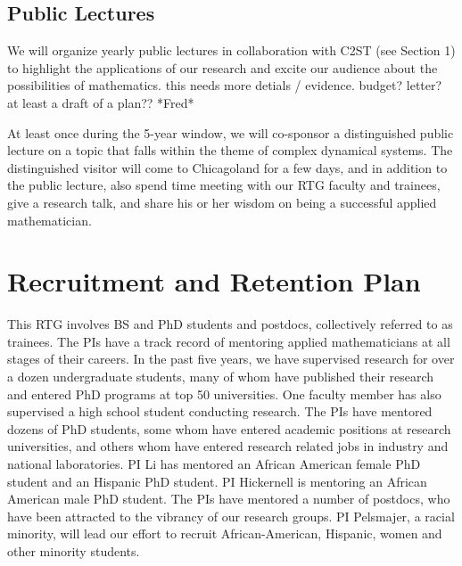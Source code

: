 \documentclass[11pt]{NSFamsart}
\begin{document}
\subsection*{Public Lectures} We will organize yearly public lectures in collaboration with  C2ST (see Section 1) to highlight the applications of   our research and excite our audience about the possibilities of mathematics.  {\color{magenta} this needs more detials / evidence. budget? letter? at least a draft of a plan?? *Fred* } 

At least once during the 5-year window, we will co-sponsor a distinguished public lecture  on a topic that falls within the theme of complex dynamical systems.  The distinguished visitor will come to Chicagoland for a few days, and in addition to the public lecture, also spend time meeting with our RTG faculty and trainees, give a research talk, and share his or her wisdom on being a successful applied mathematician. 




\section{Recruitment and Retention Plan} \label{sec:RandR}

This RTG involves BS and PhD students and postdocs, collectively referred to as trainees.  The PIs have a track record of mentoring  applied mathematicians at all stages of their careers.  In the past five years, we have supervised research for over a dozen undergraduate students, many of whom have published their research and entered PhD programs at top 50 universities. One faculty member has also supervised a high school student conducting research.  The PIs have  mentored dozens of PhD students, some whom have entered academic positions at research universities, and others whom have entered research related jobs in industry and national laboratories. PI Li has mentored an African American female PhD student and an Hispanic PhD student. PI Hickernell is mentoring an African American male PhD student.  The PIs have  mentored a number of postdocs, who have been attracted to the vibrancy of our research groups. PI  Pelsmajer, a racial minority, will lead our effort to 
recruit African-American, Hispanic, women and other minority students.
\end{document}
